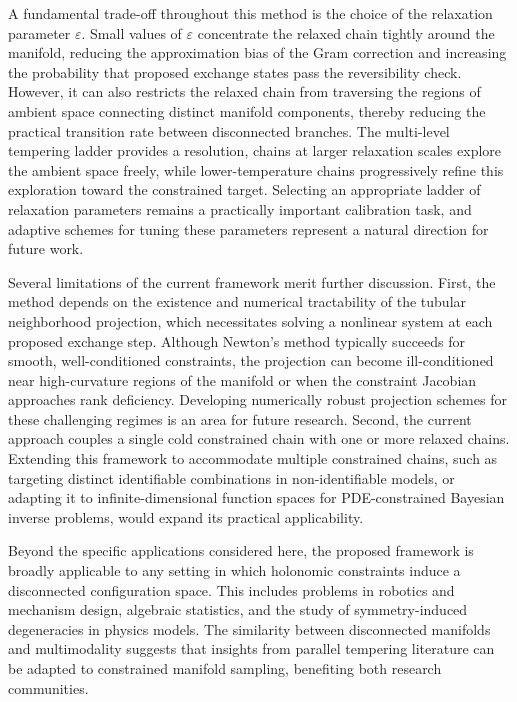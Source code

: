 \documentclass[12pt]{article}
\begin{document}
A fundamental trade-off throughout this method is the choice of the relaxation parameter $\varepsilon$. Small values of $\varepsilon$ concentrate the relaxed chain tightly around the manifold, reducing the approximation bias of the Gram correction and increasing the probability that proposed exchange states pass the reversibility check. However, it can also restricts the relaxed chain from traversing the regions of ambient space connecting distinct manifold components, thereby reducing the practical transition rate between disconnected branches. The multi-level tempering ladder provides a resolution, chains at larger relaxation scales explore the ambient space freely, while lower-temperature chains progressively refine this exploration toward the constrained target. Selecting an appropriate ladder of relaxation parameters remains a practically important calibration task, and adaptive schemes for tuning these parameters represent a natural direction for future work.

Several limitations of the current framework merit further discussion. First, the method depends on the existence and numerical tractability of the tubular neighborhood projection, which necessitates solving a nonlinear system at each proposed exchange step. Although Newton's method typically succeeds for smooth, well-conditioned constraints, the projection can become ill-conditioned near high-curvature regions of the manifold or when the constraint Jacobian approaches rank deficiency. Developing numerically robust projection schemes for these challenging regimes is an area for future research. Second, the current approach couples a single cold constrained chain with one or more relaxed chains. Extending this framework to accommodate multiple constrained chains, such as targeting distinct identifiable combinations in non-identifiable models, or adapting it to infinite-dimensional function spaces for PDE-constrained Bayesian inverse problems, would expand its practical applicability.

 Beyond the specific applications considered here, the proposed framework is broadly applicable to any setting in which holonomic constraints induce a disconnected configuration space. This includes problems in robotics and mechanism design, algebraic statistics, and the study of symmetry-induced degeneracies in physics models. The similarity between disconnected manifolds and multimodality suggests that insights from parallel tempering literature can be adapted to constrained manifold sampling, benefiting both research communities.
 
\end{document}
